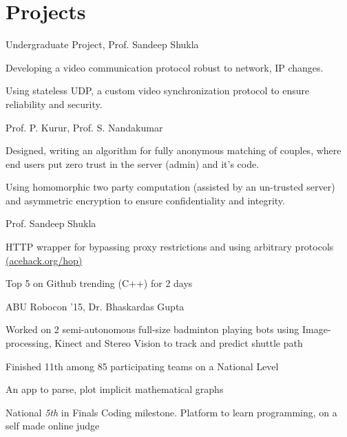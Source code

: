 \documentclass{tccv}
\begin{document}
\section{Projects}
\begin{experience}

  {Undergraduate Project, Prof. Sandeep Shukla}
  {
    \item Developing a video communication protocol robust to network,
      IP changes.
    \item Using stateless UDP, a custom video synchronization
      protocol to ensure reliability and security.
  }

  {Prof. P. Kurur, Prof. S. Nandakumar}
  {
  \item Designed, writing an algorithm
    for fully anonymous matching of couples, where end users put zero
    trust in the server (admin) and it's code.
  \item Using homomorphic two party computation (assisted by an
    un-trusted server) and asymmetric encryption to
    ensure confidentiality and integrity.
  }

  {Prof. Sandeep Shukla}
  {
  \item HTTP wrapper for bypassing proxy restrictions and using
    arbitrary protocols \href{http://acehack.org/hop}{(acehack.org/hop)}
  \item Top 5 on Github trending (C++) for 2 days
  }

  {ABU Robocon '15, Dr. Bhaskardas Gupta}
  {
  \item Worked on 2 semi-autonomous full-size badminton playing bots
  using Image-processing, Kinect and Stereo Vision to track and
    predict shuttle path
  \item Finished 11th among 85 participating teams on a National Level
  }

  {}
  {
  \item An app to parse, plot implicit mathematical graphs
  \item National \textit{5th} in Finals Coding milestone.
    Platform to learn programming, on a self made online judge
  }

\end{experience}

\vspace{-0.3cm}
\end{document}
